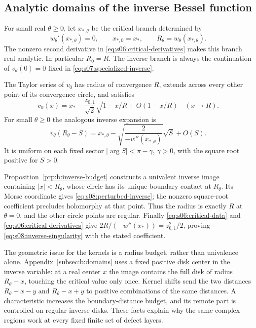 \subsection{Analytic domains of the inverse Bessel function}
\label{subsec:s08:01}

For small real $\theta\geq0$, let $x_{*,\theta}$ be the critical
branch determined by
\begin{equation}\label{eq:s08:critical-data}
 w_\theta'(x_{*,\theta})=0,\qquad x_{*,0}=x_*,\qquad
 R_\theta=w_\theta(x_{*,\theta}).
\end{equation}
The nonzero second derivative in
\eqref{eq:s06:critical-derivatives} makes this branch real analytic.
In particular $R_0=R$. The inverse branch is always the continuation
of $v_\theta(0)=0$ fixed in \eqref{eq:s07:specialized-inverse}.

\begin{lmm}\label{lmm:s08:inverse}
The Taylor series of $v_0$ has radius of convergence $R$, extends
across every other point of its convergence circle, and satisfies
\begin{equation}\label{eq:s08:inverse-singularity}
 v_0(x)=x_*-\frac{z_{0,1}}{\sqrt2}\sqrt{1-x/R}+O(1-x/R)
                                      \quad(x\longrightarrow R).
\end{equation}
For small $\theta\geq0$ the analogous inverse expansion is
\begin{equation}\label{eq:s08:perturbed-inverse}
 v_\theta(R_\theta-S)
 =x_{*,\theta}-\sqrt{\frac{2}{-w''(x_{*,\theta})}}\sqrt S+O(S).
\end{equation}
It is uniform on each fixed sector $|\arg S|<\pi-\gamma$,
$\gamma>0$, with the square root positive for $S>0$.
\end{lmm}
\begin{prf}
Proposition~\ref{prp:b:inverse-budget} constructs a univalent inverse
image containing $|x|<R_\theta$, whose circle has its unique boundary
contact at $R_\theta$. Its Morse coordinate gives
\eqref{eq:s08:perturbed-inverse}; the nonzero square-root coefficient
precludes holomorphy at that point. Thus the radius is exactly $R$
at $\theta=0$, and the other circle points are regular.
Finally \eqref{eq:s06:critical-data} and
\eqref{eq:s06:critical-derivatives} give
$2R/(-w''(x_*))=z_{0,1}^2/2$, proving
\eqref{eq:s08:inverse-singularity} with the stated coefficient.
\end{prf}

The geometric issue for the kernels is a radius budget, rather than
univalence alone. Appendix~\ref{subsec:b:domains} uses a fixed
positive disk center in the inverse variable: at a real center $x$
the image contains the full disk of radius $R_\theta-x$, touching
the critical value only once. Kernel shifts send the two distances
$R_\theta-x-y$ and $R_\theta-x+y$ to positive combinations of
the same distances. A characteristic increases the boundary-distance
budget, and its remote part is controlled on regular inverse disks.
These facts explain why the same complex regions work at every
fixed finite set of defect layers.

